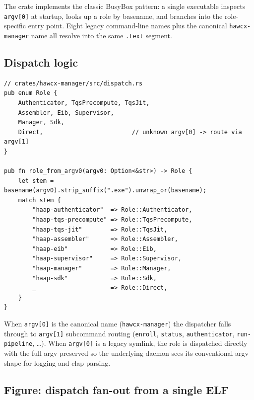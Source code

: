 \documentclass[11pt, a4paper]{article}
\newcommand{\code}[1]{\texttt{\small #1}}
\begin{document}
The crate implements the classic BusyBox pattern: a single executable
inspects \code{argv[0]} at startup, looks up a role by basename, and
branches into the role-specific entry point. Eight legacy command-line
names plus the canonical \code{hawcx-manager} name all resolve into the
same \code{.text} segment.

\subsection{Dispatch logic}

\begin{lstlisting}[language=rustlite, basicstyle=\ttfamily\footnotesize]
// crates/hawcx-manager/src/dispatch.rs
pub enum Role {
    Authenticator, TqsPrecompute, TqsJit,
    Assembler, Eib, Supervisor,
    Manager, Sdk,
    Direct,                         // unknown argv[0] -> route via argv[1]
}

pub fn role_from_argv0(argv0: Option<&str>) -> Role {
    let stem = basename(argv0).strip_suffix(".exe").unwrap_or(basename);
    match stem {
        "haap-authenticator"  => Role::Authenticator,
        "haap-tqs-precompute" => Role::TqsPrecompute,
        "haap-tqs-jit"        => Role::TqsJit,
        "haap-assembler"      => Role::Assembler,
        "haap-eib"            => Role::Eib,
        "haap-supervisor"     => Role::Supervisor,
        "haap-manager"        => Role::Manager,
        "haap-sdk"            => Role::Sdk,
        _                     => Role::Direct,
    }
}
\end{lstlisting}

When \code{argv[0]} is the canonical name (\code{hawcx-manager}) the
dispatcher falls through to \code{argv[1]} subcommand routing
(\code{enroll}, \code{status}, \code{authenticator}, \code{run-pipeline},
\dots). When \code{argv[0]} is a legacy symlink, the role is dispatched
directly with the full argv preserved so the underlying daemon sees its
conventional argv shape for logging and clap parsing.

\subsection{Figure: dispatch fan-out from a single ELF}
\end{document}
